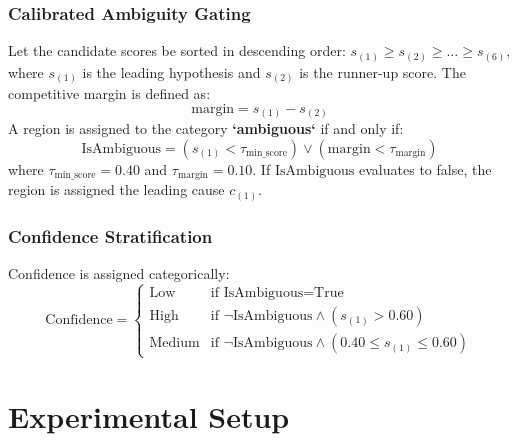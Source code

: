 \documentclass[11pt,a4paper]{article}
\begin{document}
\subsubsection{Calibrated Ambiguity Gating}
Let the candidate scores be sorted in descending order: $s_{(1)} \ge s_{(2)} \ge \dots \ge s_{(6)}$, where $s_{(1)}$ is the leading hypothesis and $s_{(2)}$ is the runner-up score. The competitive margin is defined as:
\begin{equation}
\label{eq:margin}
\text{margin} = s_{(1)} - s_{(2)}
\end{equation}
A region is assigned to the category \textbf{`ambiguous`} if and only if:
\begin{equation}
\label{eq:gate}
\text{IsAmbiguous} = \left( s_{(1)} < \tau_{\mathrm{min\_score}} \right) \lor \left( \text{margin} < \tau_{\mathrm{margin}} \right)
\end{equation}
where $\tau_{\mathrm{min\_score}} = 0.40$ and $\tau_{\mathrm{margin}} = 0.10$. If $\text{IsAmbiguous}$ evaluates to false, the region is assigned the leading cause $c_{(1)}$.

\subsubsection{Confidence Stratification}
Confidence is assigned categorically:
\begin{equation}
\label{eq:confidence}
\text{Confidence} = \begin{cases}
\text{Low} & \text{if } \text{IsAmbiguous} = \text{True} \\
\text{High} & \text{if } \neg\text{IsAmbiguous} \land (s_{(1)} > 0.60) \\
\text{Medium} & \text{if } \neg\text{IsAmbiguous} \land (0.40 \le s_{(1)} \le 0.60)
\end{cases}
\end{equation}

\section{Experimental Setup}
\label{sec:setup}
\end{document}

